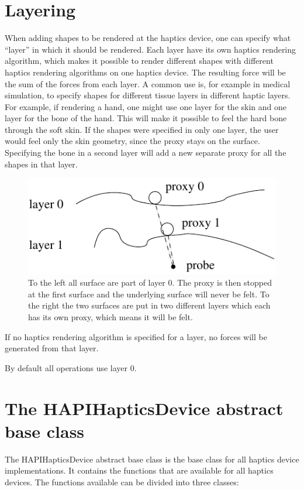 \section{Layering}
When adding shapes to be rendered at the haptics device, one can
specify what ``layer'' in which it should be rendered. Each layer have
its own haptics rendering algorithm, which makes it possible to render
different shapes with different haptics rendering algorithms on one
haptics device. The resulting force will be the sum of the forces from
each layer. A common use is, for example in medical simulation, to
specify shapes for different tissue layers in different haptic
layers. For example, if rendering a hand, one might use one layer for
the skin and one layer for the bone of the hand. This will make it
possible to feel the hard bone through the soft skin. If the shapes
were specified in only one layer, the user would feel only the skin
geometry, since the proxy stays on the surface. Specifying the bone in
a second layer will add a new separate proxy for all the shapes in
that layer. 

\begin{figure} 
  \centering 
  \includegraphics{images/layering.pdf}
  \caption{To the left all surface are part of layer 0. The proxy is then stopped at the first surface and the
underlying surface will never be felt. To the right the two surfaces are put in two different layers which
each has its own proxy, which means it will be felt.} 
  \label{Layering_fig} 
\end{figure}

If no haptics rendering algorithm is specified for a layer, no forces
will be generated from that layer.
 
By default all operations use layer 0.

\section{The HAPIHapticsDevice abstract base class}
The HAPIHapticsDevice abstract base class is the base class for all
haptics device implementations. It contains the functions that are
available for all haptics devices.  The functions available can be divided into three classes:

